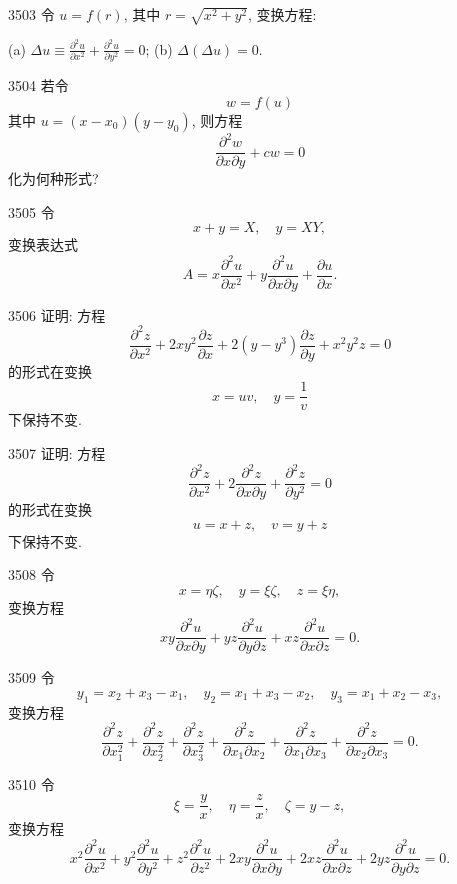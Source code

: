 \begin{prob}[M]{3503}
令 $u = f(r)$, 其中 $r = \sqrt{x^2+y^2}$, 变换方程:

(a) $\Delta u \equiv \frac{\partial^2 u}{\partial x^2} + \frac{\partial^2 u}{\partial y^2} = 0$; \qquad (b) $\Delta(\Delta u) = 0$.
\end{prob}

\begin{prob}[M]{3504}
若令
\[
w = f(u)
\]
其中 $u = (x-x_0)(y-y_0)$, 则方程
\[
\frac{\partial^2 w}{\partial x\partial y} + cw = 0
\]
化为何种形式?
\end{prob}

\begin{prob}[M]{3505}
令
\[
x+y = X, \quad y = XY,
\]
变换表达式
\[
A = x\frac{\partial^2 u}{\partial x^2} + y\frac{\partial^2 u}{\partial x\partial y} + \frac{\partial u}{\partial x}.
\]
\end{prob}

\begin{prob}[M]{3506}
证明: 方程
\[
\frac{\partial^2 z}{\partial x^2} + 2xy^2\frac{\partial z}{\partial x} + 2(y-y^3)\frac{\partial z}{\partial y} + x^2 y^2 z = 0
\]
的形式在变换
\[
x = uv, \quad y = \frac{1}{v}
\]
下保持不变.
\end{prob}

\begin{prob}[M]{3507}
证明: 方程
\[
\frac{\partial^2 z}{\partial x^2} + 2\frac{\partial^2 z}{\partial x\partial y} + \frac{\partial^2 z}{\partial y^2} = 0
\]
的形式在变换
\[
u = x+z, \quad v = y+z
\]
下保持不变.
\end{prob}

\begin{prob}[M]{3508}
令
\[
x = \eta\zeta, \quad y = \xi\zeta, \quad z = \xi\eta,
\]
变换方程
\[
xy\frac{\partial^2 u}{\partial x\partial y} + yz\frac{\partial^2 u}{\partial y\partial z} + xz\frac{\partial^2 u}{\partial x\partial z} = 0.
\]
\end{prob}

\begin{prob}[M]{3509}
令
\[
y_1 = x_2+x_3-x_1, \quad y_2 = x_1+x_3-x_2, \quad y_3 = x_1+x_2-x_3,
\]
变换方程
\[
\frac{\partial^2 z}{\partial x_1^2} + \frac{\partial^2 z}{\partial x_2^2} + \frac{\partial^2 z}{\partial x_3^2} + \frac{\partial^2 z}{\partial x_1\partial x_2} + \frac{\partial^2 z}{\partial x_1\partial x_3} + \frac{\partial^2 z}{\partial x_2\partial x_3} = 0.
\]
\end{prob}

\begin{prob}[M]{3510}
令
\[
\xi = \frac{y}{x}, \quad \eta = \frac{z}{x}, \quad \zeta = y - z,
\]
变换方程
\[
x^2\frac{\partial^2 u}{\partial x^2} + y^2\frac{\partial^2 u}{\partial y^2} + z^2\frac{\partial^2 u}{\partial z^2} + 2xy\frac{\partial^2 u}{\partial x\partial y} + 2xz\frac{\partial^2 u}{\partial x\partial z} + 2yz\frac{\partial^2 u}{\partial y\partial z} = 0.
\]
\end{prob}

